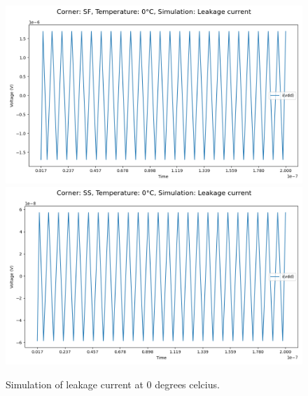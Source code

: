 \begin{figure}[H]
    \vspace{5pt}
    \includegraphics[height= 0.21\textheight]{figures/aimspice/SF/0/I.csv.png}
    \vspace{5pt}
    \includegraphics[height= 0.21\textheight]{figures/aimspice/SS/0/I.csv.png}
    \caption{Simulation of leakage current at 0 degrees celcius.}
    \label{fig:aimspice_I_0}
\end{figure}

\pagebreak

